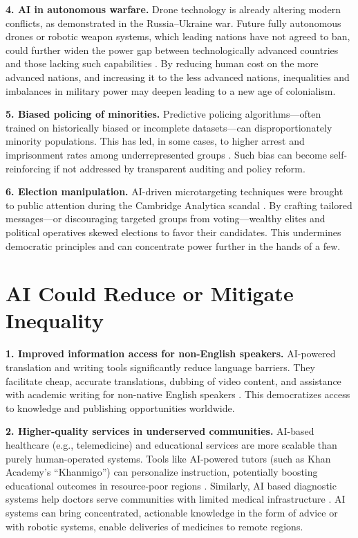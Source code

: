 \documentclass[stu,12pt,floatsintext]{apa7}
\begin{document}
\noindent \textbf{4. AI in autonomous warfare.}  
Drone technology is already altering modern conflicts, as demonstrated in the Russia–Ukraine war. Future fully autonomous drones or robotic weapon systems, which leading nations have not agreed to ban, could further widen the power gap between technologically advanced countries and those lacking such capabilities \parencite{APNews_AIFighterJet_2023}. By reducing human cost on the more advanced nations, and increasing it to the less advanced nations, inequalities and imbalances in military power may deepen leading to a new age of colonialism.

\noindent \textbf{5. Biased policing of minorities.}  
Predictive policing algorithms—often trained on historically biased or incomplete datasets—can disproportionately minority populations. This has led, in some cases, to higher arrest and imprisonment rates among underrepresented groups \parencite{MITTechReview_PredictivePolicing_2020, }. Such bias can become self-reinforcing if not addressed by transparent auditing and policy reform.

\noindent \textbf{6. Election manipulation.}  
AI-driven microtargeting techniques were brought to public attention during the Cambridge Analytica scandal \parencite{TheGreatHack_2019}. By crafting tailored messages—or discouraging targeted groups from voting—wealthy elites and political operatives skewed elections to favor their candidates. This undermines democratic principles and can concentrate power further in the hands of a few.

\section*{AI Could Reduce or Mitigate Inequality}

\noindent \textbf{1. Improved information access for non-English speakers.}  
AI-powered translation and writing tools significantly reduce language barriers. They facilitate cheap, accurate translations, dubbing of video content, and assistance with academic writing for non-native English speakers \parencite{Nature2023}. This democratizes access to knowledge and publishing opportunities worldwide.

\noindent \textbf{2. Higher-quality services in underserved communities.}  
AI-based healthcare (e.g., telemedicine) and educational services are more scalable than purely human-operated systems. Tools like AI-powered tutors (such as Khan Academy’s “Khanmigo”) can personalize instruction, potentially boosting educational outcomes in resource-poor regions \parencite{KhanAcademy_Khanmigo}. Similarly, AI based diagnostic systems help doctors serve communities with limited medical infrastructure \parencite{Wotton_Bonnardot_2015}. AI systems can bring concentrated, actionable knowledge in the form of advice or with robotic systems, enable deliveries of medicines to remote regions.
\end{document}
